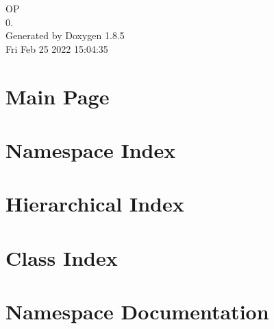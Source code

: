\documentclass[twoside]{book}
\newcommand{\clearemptydoublepage}{%
  \newpage{\pagestyle{empty}\cleardoublepage}%
}
\begin{document}
\hypersetup{pageanchor=false}
\begin{titlepage}
\vspace*{7cm}
\begin{center}%
{\Large O\-P \\[1ex]\large 0. }\\
\vspace*{1cm}
{\large Generated by Doxygen 1.8.5}\\
\vspace*{0.5cm}
{\small Fri Feb 25 2022 15:04:35}\\
\end{center}
\end{titlepage}
\clearemptydoublepage
\tableofcontents
\clearemptydoublepage
{}
\hypersetup{pageanchor=true}

\chapter{Main Page}
\label{index}\hypertarget{index}{}
\chapter{Namespace Index}

\chapter{Hierarchical Index}

\chapter{Class Index}

\chapter{Namespace Documentation}







\end{document}
